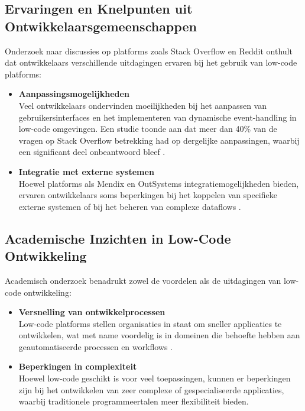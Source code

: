 \subsection{Ervaringen en Knelpunten uit Ontwikkelaarsgemeenschappen}
Onderzoek naar discussies op platforms zoals Stack Overflow en Reddit onthult dat ontwikkelaars verschillende uitdagingen ervaren bij het gebruik van low-code platforms:
\begin{itemize}
    \item \textbf{Aanpassingsmogelijkheden}
    \\
    Veel ontwikkelaars ondervinden moeilijkheden bij het aanpassen van gebruikersinterfaces en het implementeren van dynamische event-handling in low-code omgevingen. Een studie toonde aan dat meer dan 40\% van de vragen op Stack Overflow betrekking had op dergelijke aanpassingen, waarbij een significant deel onbeantwoord bleef \autocite{Alamin2021}.
    \item \textbf{Integratie met externe systemen}
    \\
    Hoewel platforms als Mendix en OutSystems integratiemogelijkheden bieden, ervaren ontwikkelaars soms beperkingen bij het koppelen van specifieke externe systemen of bij het beheren van complexe dataflows \autocite{Gadia2025}.
\end{itemize}
\subsection{Academische Inzichten in Low-Code Ontwikkeling}
Academisch onderzoek benadrukt zowel de voordelen als de uitdagingen van low-code ontwikkeling:
\begin{itemize}
    \item \textbf{Versnelling van ontwikkelprocessen}
    \\
    Low-code platforms stellen organisaties in staat om sneller applicaties te ontwikkelen, wat met name voordelig is in domeinen die behoefte hebben aan geautomatiseerde processen en workflows \autocite{Luo2021}.
    \item \textbf{Beperkingen in complexiteit}
    \\
    Hoewel low-code geschikt is voor veel toepassingen, kunnen er beperkingen zijn bij het ontwikkelen van zeer complexe of gespecialiseerde applicaties, waarbij traditionele programmeertalen meer flexibiliteit bieden.
\end{itemize}







